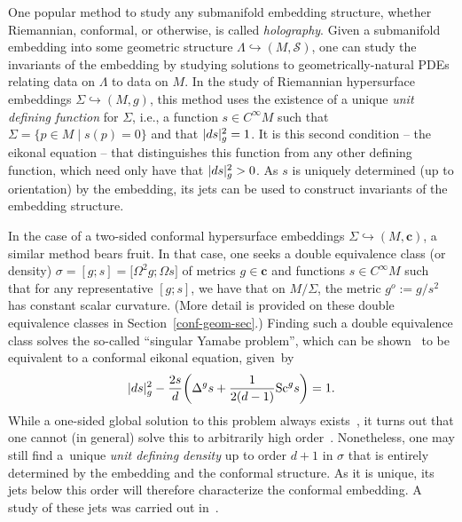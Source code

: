 \documentclass[10pt,a4paper]{article}
\numberwithin{equation}{section}
\newcommand{\cc}{\boldsymbol{c}}
\renewcommand{\=}{\stackrel \Lambda =}
\begin{document}
One popular method to study any submanifold embedding structure, whether Riemannian, conformal, or otherwise, is called \textit{holography}. Given a submanifold embedding into some geometric structure $\Lambda \hookrightarrow (M,\mathcal{S})$, one can study the invariants of the embedding by studying solutions to geometrically-natural PDEs relating data on $\Lambda$ to data on $M$. In the study of Riemannian hypersurface embeddings $\Sigma \hookrightarrow (M,g)$, this method uses the existence of a unique \textit{unit defining function} for $\Sigma$, i.e., a function $s \in C^\infty M$ such that $\Sigma = \{p \in M \mid s(p) = 0\}$ and that $|{\rm d}s|^2_g = 1$. It is this second condition -- the eikonal equation -- that distinguishes this function from any other defining function, which need only have that $|{\rm d}s|^2_g > 0$. As $s$ is uniquely determined (up to orientation) by the embedding, its jets can be used to construct invariants of the embedding structure.

In the case of a two-sided conformal hypersurface embeddings $\Sigma \hookrightarrow (M,\cc)$, a similar method bears fruit. In that case, one seeks a double equivalence class (or density) $\sigma = [g;s] = \bigl[\Omega^2 g ; \Omega s\bigr]$ of metrics $g \in \cc$ and functions $s \in C^\infty M$ such that for any representative $[g;s]$, we have that on $M/\Sigma$, the metric $g^o := g/s^2$ has constant scalar curvature. (More detail is provided on these double equivalence classes in Section~\ref{conf-geom-sec}.) Finding such a double equivalence class solves the so-called ``singular Yamabe problem'', which can be shown~\cite{Loewner} to be equivalent to a conformal eikonal equation, given~by
\[
|{\rm d}s|^2_g - \frac{2s}{d} \biggl(\Delta^g s + \frac{1}{2(d-1)} \mathrm{Sc}^g s\biggr) = 1 .
\]
While a one-sided global solution to this problem always exists~\cite{ACF,Aviles,Maz}, it turns out that one cannot (in general) solve this to arbitrarily high order~\cite{ACF,Goal}. Nonetheless, one may still find a~unique \textit{unit defining density} up to order $d+1$ in $\sigma$ that is entirely determined by the embedding and the conformal structure. As it is unique, its jets below this order will therefore characterize the conformal embedding. A study of these jets was carried out in~\cite{BGW1}.
\end{document}
